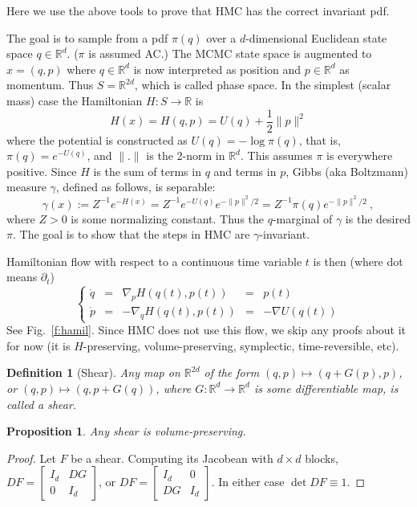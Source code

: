 \documentclass[10pt]{article}
\newcommand{\be}{\begin{equation}}
\newcommand{\ee}{\end{equation}}
\newcommand{\R}{\mathbb{R}}
\newtheorem{pro}[thm]{Proposition}
\newtheorem{dfn}[thm]{Definition}
\begin{document}
Here we use the above tools to prove that HMC has the correct invariant pdf.

The goal is to sample from a pdf $\pi(q)$ over a $d$-dimensional
Euclidean state space $q\in \R^d$. ($\pi$ is assumed AC.)
The MCMC state space is augmented to $x = (q,p)$ where $q\in \R^d$ is now interpreted as position and $p\in\R^d$ as momentum. Thus $S = \R^{2d}$, which
is called phase space.
In the simplest (scalar mass) case the Hamiltonian $H:S \to \R$ is
$$
H(x) = H(q,p) = U(q) + \frac{1}{2}\|p\|^2
$$
where the potential is constructed as $U(q) = -\log \pi(q)$, that is, $\pi(q) = e^{-U(q)}$,
and $\|.\|$ is the 2-norm in $\R^d$.
This assumes $\pi$ is everywhere positive.
Since $H$ is the sum of terms in $q$ and terms in $p$,
Gibbs (aka Boltzmann) measure $\gamma$, defined as follows, is separable:
\be
\gamma(x) := Z^{-1} e^{-H(x)} = Z^{-1} e^{-U(q)} e^{-\|p\|^2/2} = Z^{-1} \pi(q) e^{-\|p\|^2/2}~,
\label{Gibbs}
\ee
where $Z>0$ is some normalizing constant.
Thus the $q$-marginal of $\gamma$ is the desired $\pi$.
The goal is to show that the steps in HMC are $\gamma$-invariant.

Hamiltonian flow with respect to a continuous time variable $t$ is then
(where dot means $\partial_t$)
\be
\left\{\begin{array}{lllll}\dot q &=& \nabla_p H(q(t),p(t)) &=& p(t) \\
\dot p &=& -\nabla_q H(q(t),p(t)) &=& -\nabla U(q(t))
\end{array}\right.
\label{flow}
\ee
See Fig.~\ref{f:hamil}.
Since HMC does not use this flow, we skip any proofs about it for now
(it is $H$-preserving, volume-preserving, symplectic, time-reversible, etc).

\begin{dfn}[Shear]
  Any map on $\R^{2d}$ of the form
  $(q,p) \mapsto (q + G(p),p)$, or
  $(q,p) \mapsto (q, p +G(q))$,
  where $G:\R^d\to \R^d$ is some differentiable map, is called a {\em shear}.
\end{dfn}
\begin{pro}
  Any shear is volume-preserving.
  \label{p:shear}
\end{pro}
\begin{proof}
  Let $F$ be a shear.
  Computing its Jacobean with $d\times d$ blocks,
  $DF = \left[\begin{smallmatrix}I_d&DG\\0 &I_d \end{smallmatrix}\right]$, or
    $DF = \left[\begin{smallmatrix}I_d &0\\DG &I_d \end{smallmatrix}\right]$.
  In either case $\det DF \equiv 1$.
\end{proof}
\end{document}
